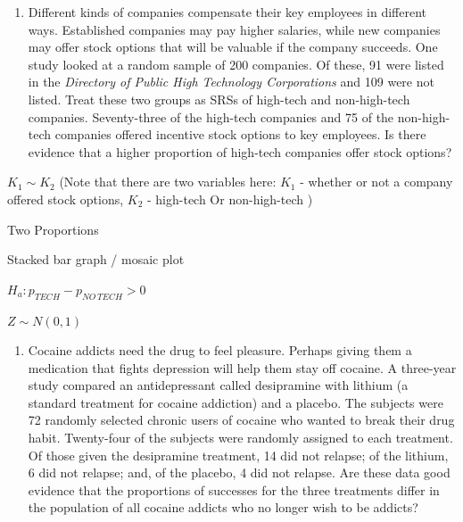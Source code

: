 \documentclass[]{article}
\providecommand{\tightlist}{%
  \setlength{\itemsep}{0pt}\setlength{\parskip}{0pt}}
\newenvironment{tight_enumerate}{ \begin{enumerate}[A)] \setlength{\itemsep}{0pt} \setlength{\parskip}{0pt}}{\end{enumerate}}
\begin{document}
\begin{enumerate}
\def\labelenumi{\arabic{enumi}.}
\setcounter{enumi}{3}
\tightlist
\item
  Different kinds of companies compensate their key employees in
  different ways. Established companies may pay higher salaries, while
  new companies may offer stock options that will be valuable if the
  company succeeds. One study looked at a random sample of 200
  companies. Of these, 91 were listed in the \emph{Directory of Public
  High Technology Corporations} and 109 were not listed. Treat these two
  groups as SRSs of high-tech and non-high-tech companies. Seventy-three
  of the high-tech companies and 75 of the non-high-tech companies
  offered incentive stock options to key employees. Is there evidence
  that a higher proportion of high-tech companies offer stock options?
\end{enumerate}

\begin{tight_enumerate}
  \item $K_1 \sim K_2$ (Note that there are two variables here:  $K_1$ - whether or not a company offered stock options, $K_2$ - high-tech Or non-high-tech )
  \item Two Proportions
  \item Stacked bar graph / mosaic plot
  \item $H_a: p_{TECH} - p_{NO \, TECH} > 0$
  \item $Z \sim N(0, 1)$
\end{tight_enumerate}

\begin{enumerate}
\def\labelenumi{\arabic{enumi}.}
\setcounter{enumi}{4}
\tightlist
\item
  Cocaine addicts need the drug to feel pleasure. Perhaps giving them a
  medication that fights depression will help them stay off cocaine. A
  three-year study compared an antidepressant called desipramine with
  lithium (a standard treatment for cocaine addiction) and a placebo.
  The subjects were 72 randomly selected chronic users of cocaine who
  wanted to break their drug habit. Twenty-four of the subjects were
  randomly assigned to each treatment. Of those given the desipramine
  treatment, 14 did not relapse; of the lithium, 6 did not relapse; and,
  of the placebo, 4 did not relapse. Are these data good evidence that
  the proportions of successes for the three treatments differ in the
  population of all cocaine addicts who no longer wish to be addicts?
\end{enumerate}
\end{document}
